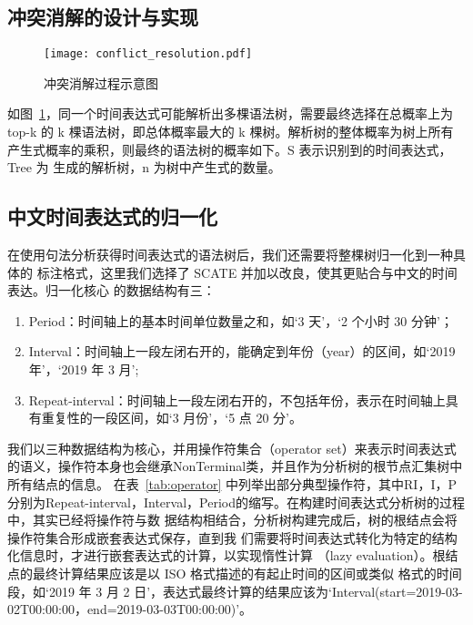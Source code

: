 \subsection{冲突消解的设计与实现}


\begin{figure}[h]
    \centering
    \texttt{[image: conflict\_resolution.pdf]}
    \caption{冲突消解过程示意图}
    \label{fig:conflict_resolution}
\end{figure}

如图~\ref{fig:conflict_resolution}，同一个时间表达式可能解析出多棵语法树，需要最终选择在总概率上为 top-k 的
k 棵语法树，即总体概率最大的 k 棵树。解析树的整体概率为树上所有产生式概率的乘积，则最终的语法树的概率如下。S 表示识别到的时间表达式，Tree 为
生成的解析树，n 为树中产生式的数量。




\subsection{中文时间表达式的归一化}

在使用句法分析获得时间表达式的语法树后，我们还需要将整棵树归一化到一种具体的
标注格式，这里我们选择了 SCATE 并加以改良，使其更贴合与中文的时间表达。归一化核心
的数据结构有三：
\begin{enumerate}
    \item Period：时间轴上的基本时间单位数量之和，如‘3 天’，‘2 个小时 30 分钟’；
    \item Interval：时间轴上一段左闭右开的，能确定到年份（year）的区间，如‘2019 年’，‘2019 年 3 月’;
    \item Repeat-interval：时间轴上一段左闭右开的，不包括年份，表示在时间轴上具有重复性的一段区间，如‘3 月份’，‘5 点 20 分’。
\end{enumerate}

我们以三种数据结构为核心，并用操作符集合（operator set）来表示时间表达式的语义，操作符本身也会继承NonTerminal类，并且作为分析树的根节点汇集树中所有结点的信息。
在表~\ref{tab:operator} 中列举出部分典型操作符，其中RI，I，P分别为Repeat-interval，Interval，Period的缩写。在构建时间表达式分析树的过程中，其实已经将操作符与数
据结构相结合，分析树构建完成后，树的根结点会将操作符集合形成嵌套表达式保存，直到我
们需要将时间表达式转化为特定的结构化信息时，才进行嵌套表达式的计算，以实现惰性计算
（lazy evaluation）。根结点的最终计算结果应该是以 ISO 格式描述的有起止时间的区间或类似
格式的时间段，如‘2019 年 3 月 2 日’，表达式最终计算的结果应该为‘Interval(start=2019-03-
02T00:00:00，end=2019-03-03T00:00:00)’。


